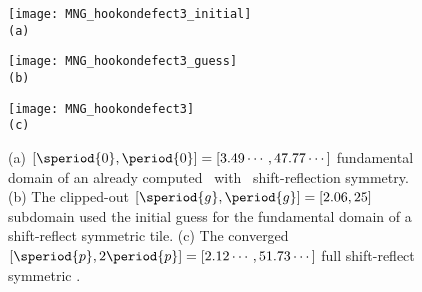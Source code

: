 \begin{figure}
\begin{minipage}[height=.4\textheight]{.32\textwidth}
\centering
\texttt{[image: MNG\_hookondefect3\_initial]}
   \\ \small{\texttt{(a)}}
\end{minipage}
\begin{minipage}[height=.4\textheight]{.32\textwidth}
\centering
\texttt{[image: MNG\_hookondefect3\_guess]}
   \\ \small{\texttt{(b)}}
\end{minipage}
\begin{minipage}[height=.4\textheight]{.32\textwidth}
\centering
\texttt{[image: MNG\_hookondefect3]}
   \\ \small{\texttt{(c)}}
\end{minipage}
\caption{ \label{fig:hookondefect3}
(a)
$[\speriod{0},\period{0}]=[3.49\cdots,47.77\cdots]$ fundamental domain
of an already computed \twot\ with \spt\ shift-reflection symmetry.
(b)
The clipped-out $[\speriod{g},\period{g}]=[2.06,25]$ subdomain used the
initial guess for the fundamental domain of a shift-reflect symmetric tile.
(c)
The converged $[\speriod{p},2\period{p}]=[2.12\cdots,51.73\cdots]$ full
shift-reflect symmetric \twot.
}
\end{figure}




